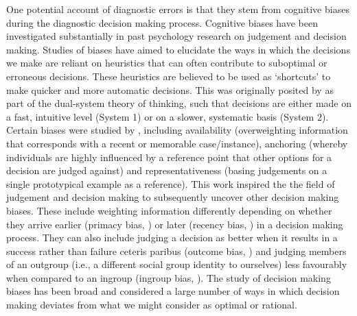 \documentclass[a4paper, nobind]{templates/ociamthesis}
\begin{document}
One potential account of diagnostic errors is that they stem from cognitive biases during the diagnostic decision making process. Cognitive biases have been investigated substantially in past psychology research on judgement and decision making. Studies of biases have aimed to elucidate the ways in which the decisions we make are reliant on heuristics that can often contribute to suboptimal or erroneous decisions. These heuristics are believed to be used as `shortcuts' to make quicker and more automatic decisions. This was originally posited by \textcite{tversky1974} as part of the dual-system theory of thinking, such that decisions are either made on a fast, intuitive level (System 1) or on a slower, systematic basis (System 2). Certain biases were studied by \textcite{tversky1974}, including availability (overweighting information that corresponds with a recent or memorable case/instance), anchoring (whereby individuals are highly influenced by a reference point that other options for a decision are judged against) and representativeness (basing judgements on a single prototypical example as a reference). This work inspired the the field of judgement and decision making to subsequently uncover other decision making biases. These include weighting information differently depending on whether they arrive earlier (primacy bias, \textcite{saetrevik_anchoring_2020}) or later (recency bias, \textcite{chapman_order_1996}) in a decision making process. They can also include judging a decision as better when it results in a success rather than failure ceteris paribus (outcome bias, \autocite{baron_outcome_1988,aiyer_outcomes_2023}) and judging members of an outgroup (i.e., a different social group identity to ourselves) less favourably when compared to an ingroup (ingroup bias, \autocite{tarrant_social_2012}). The study of decision making biases has been broad and considered a large number of ways in which decision making deviates from what we might consider as optimal or rational.
\end{document}
